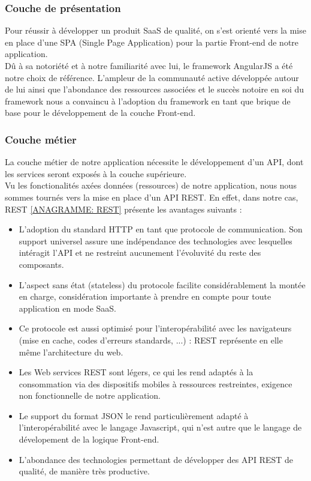 \begin{spacing}{1.5}
\subsubsection*{Couche de présentation}
Pour réussir à développer un produit SaaS de qualité, on s'est orienté vers la mise en place d'une SPA (Single Page Application) pour la partie Front-end de notre application.\\

Dû à sa notoriété et à notre familiarité avec lui, le framework AngularJS a été notre choix de référence. L'ampleur de la communauté active développée autour de lui ainsi que l'abondance des ressources associées et le succès notoire en soi du framework nous a convaincu à l'adoption du framework en tant que brique de base pour le développement de la couche Front-end.

\subsubsection*{Couche métier}
La couche métier de notre application nécessite le développement d'un API, dont les services seront exposés à la couche supérieure.\\
Vu les fonctionalités axées données (ressources) de notre application, nous nous sommes tournés vers la mise en place d'un API REST. En effet, dans notre cas, REST \ref{ANAGRAMME: REST} présente les avantages suivants :
\begin{itemize}
    \item L'adoption du standard HTTP en tant que protocole de communication. Son support universel assure une indépendance des technologies avec lesquelles intéragit l'API et ne restreint aucunement l'évoluvité du reste des composants.
    \item L'aspect sans état (stateless) du protocole facilite considérablement la montée en charge, considération importante à prendre en compte pour toute application en mode SaaS.
    \item Ce protocole est aussi optimisé pour l'interopérabilité avec les navigateurs (mise en cache, codes d'erreurs standards, ...) : REST représente en elle même l'architecture du web.
    \item Les Web services REST sont légers, ce qui les rend adaptés à la consommation via des dispositifs mobiles à ressources restreintes, exigence non fonctionnelle de notre application.
    \item Le support du format JSON le rend particulièrement adapté à l'interopérabilité avec le langage Javascript, qui n'est autre que le langage de dévelopement de la logique Front-end.
    \item L'abondance des technologies permettant de développer des API REST de qualité, de manière très productive.
\end{itemize}
\


\end{spacing}
